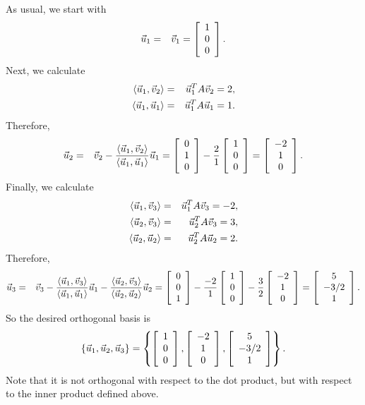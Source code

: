 \documentclass{ximera}
\begin{document}
\begin{solution}
  As usual, we start with
  \begin{eqnarray*}
    \vect{u}_1 &=& \vect{v}_1 = \startmat{c} 1 \\ 0 \\ 0 \stopmat.
  \end{eqnarray*}
  Next, we calculate
  \begin{eqnarray*}
    \iprod{\vect{u}_1,\vect{v}_2} &=& \vect{u}_1^TA\vect{v}_2 = 2, \\
    \iprod{\vect{u}_1,\vect{u}_1} &=& \vect{u}_1^TA\vect{u}_1 = 1.
  \end{eqnarray*}
  Therefore,
  \begin{eqnarray*}
    \vect{u}_2
    &=& \vect{v}_2
        - \frac{\iprod{\vect{u}_1,\vect{v}_2}}{\iprod{\vect{u}_1,\vect{u}_1}} \vect{u}_1
        = \startmat{c} 0 \\ 1 \\ 0 \stopmat
    - \frac{2}{1} \startmat{c} 1 \\ 0 \\ 0 \stopmat
    = \startmat{c} -2 \\ 1 \\ 0 \stopmat.
  \end{eqnarray*}
  Finally, we calculate
  \begin{eqnarray*}
    \iprod{\vect{u}_1,\vect{v}_3} &=& \vect{u}_1^TA\vect{v}_3 = -2, \\
    \iprod{\vect{u}_2,\vect{v}_3} &=& \vect{u}_2^TA\vect{v}_3 = 3, \\
    \iprod{\vect{u}_2,\vect{u}_2} &=& \vect{u}_2^TA\vect{u}_2 = 2.
  \end{eqnarray*}
  Therefore,
  \begin{eqnarray*}
    \vect{u}_3
    &=& \vect{v}_3
        - \frac{\iprod{\vect{u}_1,\vect{v}_3}}{\iprod{\vect{u}_1,\vect{u}_1}} \vect{u}_1
        - \frac{\iprod{\vect{u}_2,\vect{v}_3}}{\iprod{\vect{u}_2,\vect{u}_2}} \vect{u}_2
        = \startmat{c} 0 \\ 0 \\ 1 \stopmat
    - \frac{-2}{1} \startmat{c} 1 \\ 0 \\ 0 \stopmat
    - \frac{3}{2} \startmat{c} -2 \\ 1 \\ 0 \stopmat
    = \startmat{c} 5 \\ -3/2 \\ 1 \stopmat.
  \end{eqnarray*}
  So the desired orthogonal basis is
  \begin{equation*}
    \set{\vect{u}_1,\vect{u}_2,\vect{u}_3}
    = \set{
      \startmat{c} 1 \\ 0 \\ 0 \stopmat,
      \startmat{c} -2 \\ 1 \\ 0 \stopmat,
      \startmat{c} 5 \\ -3/2 \\ 1 \stopmat
    }.
  \end{equation*}
  Note that it is not orthogonal with respect to the dot product, but
  with respect to the inner product defined above.
\end{solution}
\end{document}
